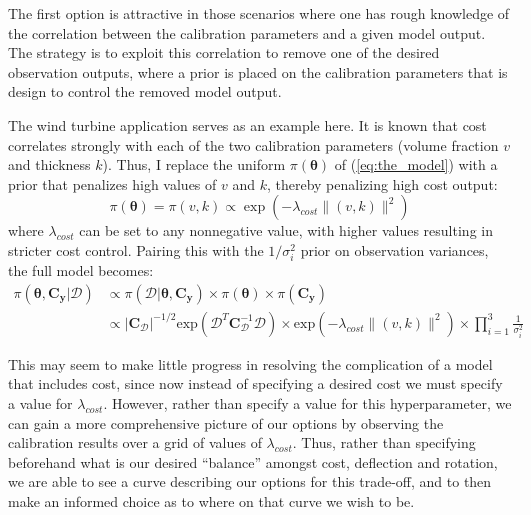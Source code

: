 \documentclass{article}
\begin{document}

The first option is attractive in those scenarios where one has rough knowledge of the correlation between the calibration parameters and a given model output. The strategy is to exploit this correlation to remove one of the desired observation outputs, where a prior is placed on the calibration parameters that is design to control the removed model output.

The wind turbine application serves as an example here. It is known that cost correlates strongly with each of the two calibration parameters (volume fraction $v$ and thickness $k$). Thus, I replace the uniform $\pi(\boldsymbol \theta)$ of (\ref{eq:the_model}) with a prior that penalizes high values of $v$ and $k$, thereby penalizing high cost output:
\begin{equation}\label{eq:theta_prior}
\pi(\boldsymbol \theta)=\pi(v,k)\propto \exp(-\lambda_{cost}\lVert (v,k)\rVert ^2)
\end{equation}
where $\lambda_{cost}$ can be set to any nonnegative value, with higher values resulting in stricter cost control. Pairing this with the $1/\sigma^2_i$ prior on observation variances, the full model becomes:
\begin{equation}\label{full_model_3}
\begin{aligned}
\pi(\boldsymbol\theta,\mathbf C_{\mathbf y}|\mathcal D ) &\propto
\pi(\mathcal D|\boldsymbol\theta,\mathbf C_{\mathbf y}) \times \pi(\boldsymbol\theta) \times \pi(\mathbf C_{\mathbf y})\\
&\propto \lvert \mathbf C_{\mathcal D} \rvert ^{-1/2} \mathrm{exp}(\mathcal D^T \mathbf C_{\mathcal D}^{-1} \mathcal D) \times \mathrm{exp}(-\lambda_{cost}\lVert(v,k)\rVert^2)\times\prod_{i=1}^3 \frac1{\sigma^2_i}
\end{aligned}
\end{equation}

This may seem to make little progress in resolving the complication of a model that includes cost, since now instead of specifying a desired cost we must specify a value for $\lambda_{cost}$. However, rather than specify a value for this hyperparameter, we can gain a more comprehensive picture of our options by observing the calibration results over a grid of values of $\lambda_{cost}$. Thus, rather than specifying beforehand what is our desired ``balance'' amongst cost, deflection and rotation, we are able to see a curve describing our options for this trade-off, and to then make an informed choice as to where on that curve we wish to be. 
\end{document}
